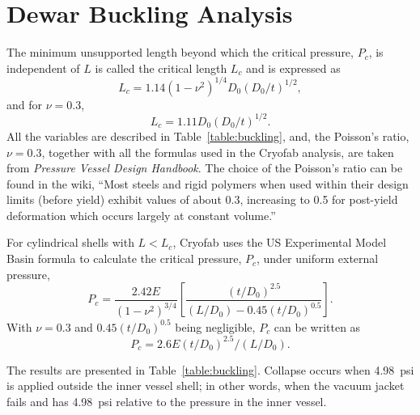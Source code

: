\section{Dewar Buckling Analysis}
\label{app:buckling}

The minimum unsupported length beyond which the critical pressure, $P_c$, is independent of $L$
is called the critical length $L_c$ and is expressed as
\begin{equation}
    L_c = 1.14(1-\nu^2)^{1/4}D_0(D_0/t)^{1/2},
\end{equation}
and for $\nu=0.3$,
\begin{equation}
    \label{eq:critical_l}
    L_c = 1.11D_0(D_0/t)^{1/2}.
\end{equation}
All the variables are described in Table~\ref{table:buckling}, and, 
the Poisson's ratio, $\nu= 0.3$, together with all the formulas used in the Cryofab analysis,
are taken from \textit{Pressure Vessel Design Handbook}.
The choice of the Poisson's ratio can be found in the wiki,
``Most steels and rigid polymers when used within their design limits (before yield) 
exhibit values of about 0.3, increasing to 0.5 for post-yield deformation which occurs 
largely at constant volume.''



For cylindrical shells with $L<L_c$,
Cryofab uses the US Experimental Model Basin formula to calculate the critical pressure, $P_c$,
under uniform external pressure,
\begin{equation}
    P_c = \frac{2.42E}{(1-\nu^2)^{3/4}}\left[\frac{(t/D_0)^{2.5}}{(L/D_0)-0.45(t/D_0)^{0.5}}\right].
\end{equation}
With $\nu = 0.3$ and $0.45(t/D_0)^{0.5}$ being negligible, $P_c$ can be written as
\begin{equation}
    \label{eq:critical_P}
    P_c = 2.6E(t/D_0)^{2.5}/(L/D_0).
\end{equation}

The results are presented in Table~\ref{table:buckling}.
Collapse occurs when 4.98~psi is applied outside the inner vessel shell; in other words,
when the vacuum jacket fails and has 4.98~psi relative to the pressure in the inner vessel.
